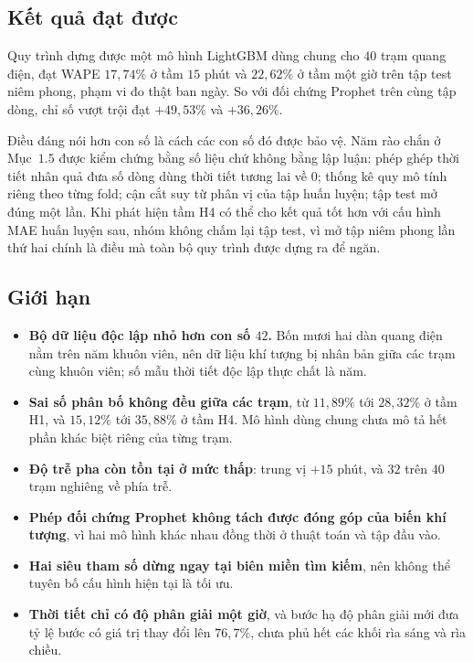 \documentclass[12pt,a4paper]{article}
\begin{document}
\subsection{Kết quả đạt được}

Quy trình dựng được một mô hình LightGBM dùng chung cho $40$ trạm quang điện, đạt WAPE
$17{,}74\%$ ở tầm $15$ phút và $22{,}62\%$ ở tầm một giờ trên tập test niêm phong, phạm vi đo
thật ban ngày. So với đối chứng Prophet trên cùng tập dòng, chỉ số vượt trội đạt $+49{,}53\%$
và $+36{,}26\%$.

Điều đáng nói hơn con số là cách các con số đó được bảo vệ. Năm rào chắn ở Mục~$1.5$ được kiểm
chứng bằng số liệu chứ không bằng lập luận: phép ghép thời tiết nhân quả đưa số dòng dùng thời
tiết tương lai về $0$; thống kê quy mô tính riêng theo từng fold; cận cắt suy từ phân vị của
tập huấn luyện; tập test mở đúng một lần. Khi phát hiện tầm H4 có thể cho kết quả tốt hơn với
cấu hình MAE huấn luyện sau, nhóm không chấm lại tập test, vì mở tập niêm phong lần thứ hai
chính là điều mà toàn bộ quy trình được dựng ra để ngăn.

\subsection{Giới hạn}

\begin{itemize}
    \item \textbf{Bộ dữ liệu độc lập nhỏ hơn con số $42$.} Bốn mươi hai dàn quang điện nằm trên
    năm khuôn viên, nên dữ liệu khí tượng bị nhân bản giữa các trạm cùng khuôn viên; số mẫu
    thời tiết độc lập thực chất là năm.
    \item \textbf{Sai số phân bố không đều giữa các trạm}, từ $11{,}89\%$ tới $28{,}32\%$ ở
    tầm H1, và $15{,}12\%$ tới $35{,}88\%$ ở tầm H4. Mô hình dùng chung chưa mô tả hết phần khác
    biệt riêng của từng trạm.
    \item \textbf{Độ trễ pha còn tồn tại ở mức thấp}: trung vị $+15$ phút, và $32$ trên $40$
    trạm nghiêng về phía trễ.
    \item \textbf{Phép đối chứng Prophet không tách được đóng góp của biến khí tượng}, vì hai
    mô hình khác nhau đồng thời ở thuật toán và tập đầu vào.
    \item \textbf{Hai siêu tham số dừng ngay tại biên miền tìm kiếm}, nên không thể tuyên bố
    cấu hình hiện tại là tối ưu.
    \item \textbf{Thời tiết chỉ có độ phân giải một giờ}, và bước hạ độ phân giải mới đưa tỷ lệ
    bước có giá trị thay đổi lên $76{,}7\%$, chưa phủ hết các khối rìa sáng và rìa chiều.
\end{itemize}
\end{document}
